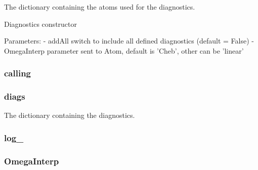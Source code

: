 The dictionary containing the atoms used for the diagnostics. 

\begin{DoxyVerb}Diagnostics constructor

Parameters:
    - addAll        switch to include all defined diagnostics (default = False)
    - OmegaInterp   parameter sent to Atom, default is 'Cheb', other can be 'linear'\end{DoxyVerb}
 \hypertarget{classpyneb_1_1core_1_1diags_1_1_diagnostics_ab25fa7ebe84b603684dee62410c1e34c}{
\subsubsection[{calling}]{\setlength{\rightskip}{0pt plus 5cm}calling}}\label{classpyneb_1_1core_1_1diags_1_1_diagnostics_ab25fa7ebe84b603684dee62410c1e34c}
\hypertarget{classpyneb_1_1core_1_1diags_1_1_diagnostics_af600b32fdefbb2e4ed370e8dd91bfc7b}{
\subsubsection[{diags}]{\setlength{\rightskip}{0pt plus 5cm}diags}}\label{classpyneb_1_1core_1_1diags_1_1_diagnostics_af600b32fdefbb2e4ed370e8dd91bfc7b}


The dictionary containing the diagnostics. 

\hypertarget{classpyneb_1_1core_1_1diags_1_1_diagnostics_afd87151907f32bc0dc45f0171b61374e}{
\subsubsection[{log\-\_\-}]{\setlength{\rightskip}{0pt plus 5cm}log\-\_\-}}\label{classpyneb_1_1core_1_1diags_1_1_diagnostics_afd87151907f32bc0dc45f0171b61374e}
\hypertarget{classpyneb_1_1core_1_1diags_1_1_diagnostics_a9fb4568356c398593832b0d4f2eb18d9}{
\subsubsection[{Omega\-Interp}]{\setlength{\rightskip}{0pt plus 5cm}Omega\-Interp}}\label{classpyneb_1_1core_1_1diags_1_1_diagnostics_a9fb4568356c398593832b0d4f2eb18d9}
